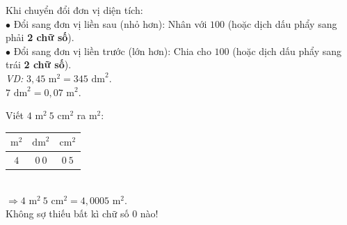 \documentclass[14pt,a4paper,oneside]{extbook}
\begin{document}
\noindent
\begin{minipage}[t]{0.52\textwidth}
  \begin{tcolorbox}[
    enhanced,
    title={\footnotesize\bfseries\color{white}\faKey\ 2. Nguyên tắc vàng ``2 chữ số mỗi cột''},
    colback=teal!2!white,
    colframe=teal!75!black,
    arc=2.5mm, boxrule=0.8pt, top=1.8mm, bottom=1.8mm, left=2.2mm, right=2.2mm
  ]
    \footnotesize
    Khi chuyển đổi đơn vị diện tích:\\
    $\bullet$ Đổi sang đơn vị liền sau (nhỏ hơn): Nhân với $100$ (hoặc dịch dấu phẩy sang phải \textbf{2 chữ số}).\\
    $\bullet$ Đổi sang đơn vị liền trước (lớn hơn): Chia cho $100$ (hoặc dịch dấu phẩy sang trái \textbf{2 chữ số}).\\
    \textit{VD:} $3,45\text{ m}^2 = 345\text{ dm}^2$.\\
    $7\text{ dm}^2 = 0,07\text{ m}^2$.
  \end{tcolorbox}
\end{minipage}%
\hfill
\begin{minipage}[t]{0.46\textwidth}
  \begin{tcolorbox}[
    enhanced,
    title={\footnotesize\bfseries\color{white}\faSearch\ 3. Phương pháp lập bảng nhẩm},
    colback=purple!2!white,
    colframe=purple!70!black,
    arc=2.5mm, boxrule=0.8pt, top=1.8mm, bottom=1.8mm, left=2mm, right=2mm
  ]
    \footnotesize
    Viết $4\text{ m}^2\ 5\text{ cm}^2$ ra $\text{m}^2$:\\
    \centering
    \begin{tabular}{|c|c|c|}
      \hline
      $\text{m}^2$ & $\text{dm}^2$ & $\text{cm}^2$ \\ \hline
      $4$ & $0\ 0$ & $0\ 5$ \\ \hline
    \end{tabular}\\[2pt]
    $\Rightarrow 4\text{ m}^2\ 5\text{ cm}^2 = 4,0005\text{ m}^2$.\\
    Không sợ thiếu bất kì chữ số $0$ nào!
  \end{tcolorbox}
\end{minipage}

\vspace{3mm}
\end{document}
